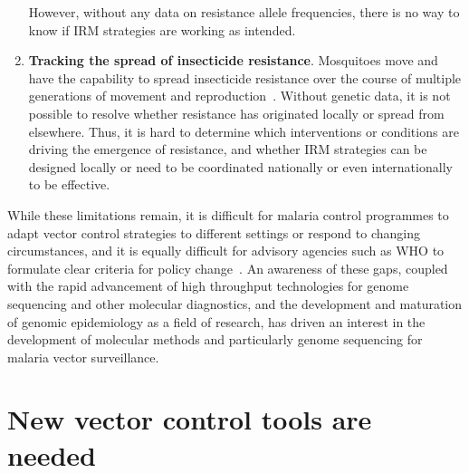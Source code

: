 \begin{refsection}
\begin{enumerate}
%
However, without any data on resistance allele frequencies, there is no way to know if IRM strategies are working as intended.
%
\item \textbf{Tracking the spread of insecticide resistance}. 
%
Mosquitoes move and have the capability to spread insecticide resistance over the course of multiple generations of movement and reproduction~\parencite{Service1997,Huestis2019}.
%
Without genetic data, it is not possible to resolve whether resistance has originated locally or spread from elsewhere.
%
Thus, it is hard to determine which interventions or conditions are driving the emergence of resistance, and whether IRM strategies can be designed locally or need to be coordinated nationally or even internationally to be effective.
%
\end{enumerate}
%
While these limitations remain, it is difficult for malaria control programmes to adapt vector control strategies to different settings or respond to changing circumstances, and it is equally difficult for advisory agencies such as WHO to formulate clear criteria for policy change~\parencite{WHO2017PBOLLIN}.
%
An awareness of these gaps, coupled with the rapid advancement of high throughput technologies for genome sequencing and other molecular diagnostics, and the development and maturation of genomic epidemiology as a field of research, has driven an interest in the development of molecular methods and particularly genome sequencing for malaria vector surveillance.


\section{New vector control tools are needed}\label{sec:new-tools}


\end{refsection}
